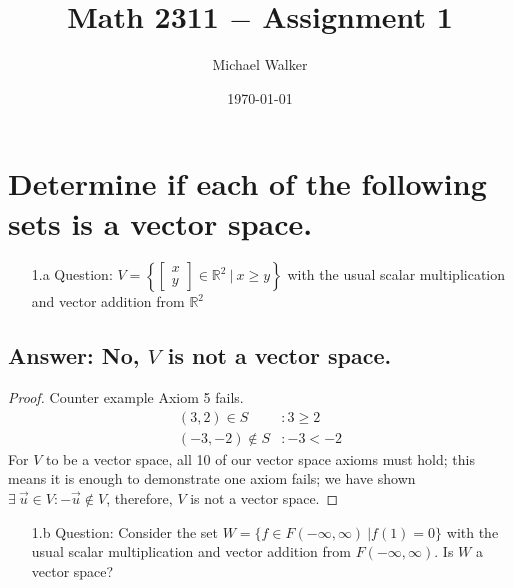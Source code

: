 \documentclass[12pt]{article}
\author{Michael Walker}
\title{Math 2311 $-$ Assignment 1}
\date{\today}
\newcommand{\DS} [1] {${\displaystyle #1}$}
\begin{document}
\maketitle
\tableofcontents
\pagebreak
\section{Determine if each of the following sets is a vector space.}
\begin{enumerate}
        \item[1.a]Question: $V=$\DS{ \left\{ \left[ \begin{array}{c}
                                      x \\
                                      y
                              \end{array} \right] \in\mathbb{R}^2 \ | \ x \geq{y} \right\}}
              with the usual scalar multiplication
              and vector addition from $\mathbb{R}^2$
\end{enumerate}
\subsection{Answer: No, $V$ is not a vector space.}

\begin{proof}
        Counter example Axiom 5 fails.
        \begin{align*}
                (3, 2) \in S      & : 3\geq 2 \\
                (-3, -2) \notin S & : -3 < -2
        \end{align*}
        For $V$ to be a vector space, all 10 of our vector space axioms must hold; this means it is enough to demonstrate one axiom fails; we have shown $\exists\ \vec{u} \in V: -\vec{u} \notin V$, therefore, $V$ is not a vector space.
\end{proof}
\begin{enumerate}
        \item[1.b]Question: Consider the set $W = \{f \in F(-\infty, \infty) \ | f(1) = 0\}$
              with the usual scalar multiplication and vector addition from
              $F(-\infty, \infty)$.
              Is $W$ a vector space?
\end{enumerate}
\end{document}
